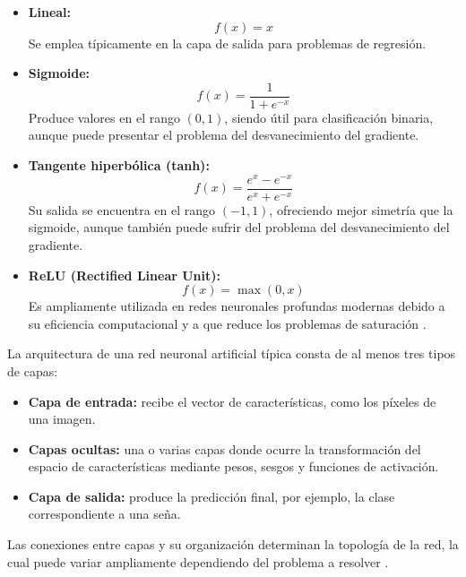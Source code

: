 	
	\begin{itemize}
		\item \textbf{Lineal:}
		\begin{equation}
			f(x) = x
		\end{equation}
		Se emplea típicamente en la capa de salida para problemas de regresión.
		
		\item \textbf{Sigmoide:}
		\begin{equation}
			f(x) = \frac{1}{1 + e^{-x}}
		\end{equation}
		Produce valores en el rango $(0,1)$, siendo útil para clasificación binaria, aunque puede presentar el problema del desvanecimiento del gradiente.
		
		\item \textbf{Tangente hiperbólica (tanh):}
		\begin{equation}
			f(x) = \frac{e^{x} - e^{-x}}{e^{x} + e^{-x}}
		\end{equation}
		Su salida se encuentra en el rango $(-1,1)$, ofreciendo mejor simetría que la sigmoide, aunque también puede sufrir del problema del desvanecimiento del gradiente.
		
		\item \textbf{ReLU (Rectified Linear Unit):}
		\begin{equation}
			f(x) = \max(0, x)
		\end{equation}
		Es ampliamente utilizada en redes neuronales profundas modernas debido a su eficiencia computacional y a que reduce los problemas de saturación \cite{haykin1999}.
	\end{itemize}
	
	La arquitectura de una red neuronal artificial típica consta de al menos tres tipos de capas:
	
	\begin{itemize}
		\item \textbf{Capa de entrada:} recibe el vector de características, como los píxeles de una imagen.
		
		\item \textbf{Capas ocultas:} una o varias capas donde ocurre la transformación del espacio de características mediante pesos, sesgos y funciones de activación.
		
		\item \textbf{Capa de salida:} produce la predicción final, por ejemplo, la clase correspondiente a una seña.
	\end{itemize}
	
	Las conexiones entre capas y su organización determinan la topología de la red, la cual puede variar ampliamente dependiendo del problema a resolver \cite{haykin1999}.
	
